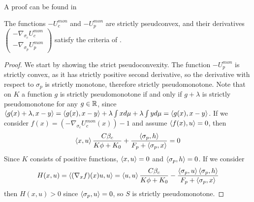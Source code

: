 A proof can be found in \citep[Proposition 2.8, p.96]{hadjisavvas2006handbook}
\begin{proposition}
  The functions $-U_c^{mon}$ and $-U_p^{mon}$ are strictly pseudconvex, and their derivatives $\begin{pmatrix}-\nabla_{\sigma_c} U_c^{mon} \\ -\nabla_{\sigma_p} U_p^{mon}\end{pmatrix}$ satisfy the criteria of .
\end{proposition}
\begin{proof}
  We start by showing the strict pseudoconvexity. The function $-U_p^{mon}$ is strictly convex, as it has strictly positive second derivative, so the derivative with respect to $\sigma_p$ is strictly monotone, therefore strictly pseudomonotone. Note that on $K$ a function $g$ is strictly pseudomonotone if and only if $g+\lambda$ is strictly pseudomonotone for any $g\in \mathbb{R}$, since $\left \langle g(x)+\lambda,x-y \right \rangle=\left \langle g(x),x-y \right \rangle+\lambda \int x d\mu + \lambda \int y d\mu=\left \langle g(x),x-y \right \rangle$. If we consider $f(x)=(-\nabla_{\sigma_c} U_c^{mon}(x))-1$ and assume $\left \langle f(x),u \right \rangle = 0$, then
  \begin{equation}
    \ip{x}{u}\frac{C \beta_c }{K\phi + K_0} + \frac{\ip{\sigma_p}{h}}{F_p + \ip{\sigma_p}{x}} = 0
  \end{equation}
  Since $K$ consists of positive functions, $\left \langle x,u \right \rangle = 0$ and $\left \langle \sigma_p,h \right \rangle = 0$. If we consider
  \begin{equation}
    H(x,u)=\ip{(\nabla_x f)(x)u}{u} = \ip{u}{u}\frac{ C \beta_c }{K\phi + K_0} - \frac{\ip{\sigma_p}{u}\ip{\sigma_p}{h}}{F_p + \ip{\sigma_p}{x}}
  \end{equation}
  then $H(x,u)>0$ since $\left \langle \sigma_p,u \right \rangle=0$, so $S$ is strictly pseudomonotone.


\end{proof}
